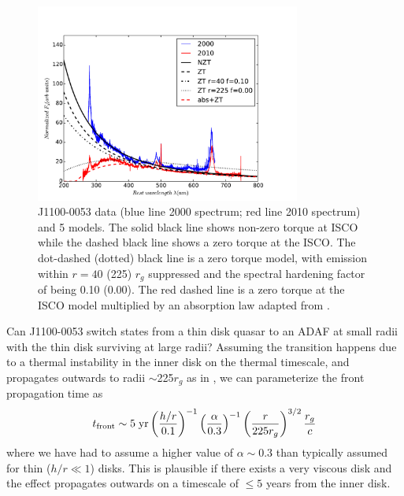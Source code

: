 \documentclass[a4paper,fleqn,usenatbib]{mnras}
\begin{document}
\begin{figure}
  \centering
  \includegraphics[width=8.7cm, trim=0.2cm 0.2cm 1.4cm 0.6cm, clip]
  {../plots/models/mcd_gap_v3_4_b1.pdf}
  \vspace{-12pt}
  \caption[]{
    J1100-0053 data (blue line 2000 spectrum; red line 2010 spectrum) and
    5 models. The solid black line shows non-zero torque at ISCO
    \citep[following][]{Afshordi_Paczynski2003} while the
    dashed black line shows a zero torque at the ISCO. 
    The dot-dashed  (dotted) black line is a zero torque model, with emission
    within $r=40$ (225) $r_{g}$ suppressed and the spectral hardening factor of
  \citet{Zimmerman2005} being 0.10 (0.00). 
  The red dashed line is a zero
  torque at the ISCO model multiplied by an absorption law adapted from
  \citet{Guo2016}.
}
  \label{fig:disk_suppression}
\end{figure}
Can J1100-0053 switch states from a thin disk quasar to an ADAF at
small radii with the thin disk surviving at large radii?  Assuming the
transition happens due to a thermal instability in the inner disk on
the thermal timescale, and propagates outwards to radii
$\sim$225$r_{g}$ as in \citet{Nemmen2006}, we can parameterize the
front propagation time as
\begin{equation}
    t_{\rm front}  \sim  5 \; {\rm yr} \left(\frac{h/r}{0.1}\right)^{-1}
                                                           \left(\frac{\alpha}{0.3}\right)^{-1}  
                                                           \left(\frac{r}{225r_{g}}\right)^{3/2}  
                                                           \frac{r_{g}}{c}
\label{eqn:t_front}
\end{equation}
where we have had to assume a higher value of $\alpha \sim 0.3$
\citep{King2007} than typically assumed for thin ($h/r \ll 1$)
disks. This is plausible if there exists a very viscous disk and the
effect propagates outwards on a timescale of $\leq 5$ years from the
inner disk.
\end{document}
